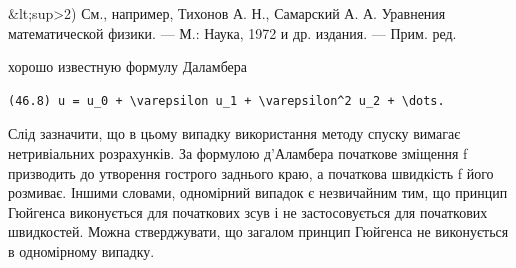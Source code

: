 \documentclass[
  ukrainian,
]{article}
\begin{document}
\&lt;sup\textgreater2) См., например, Тихонов А. Н., Самарский А. А.
Уравнения математической физики. --- М.: Наука, 1972 и др. издания. ---
Прим. ред.

хорошо известную формулу Даламбера

\begin{verbatim}
(46.8) u = u_0 + \varepsilon u_1 + \varepsilon^2 u_2 + \dots.
\end{verbatim}

Слід зазначити, що в цьому випадку використання методу спуску вимагає
нетривіальних розрахунків. За формулою д'Аламбера початкове зміщення f
призводить до утворення гострого заднього краю, а початкова швидкість f
його розмиває. Іншими словами, одномірний випадок є незвичайним тим, що
принцип Гюйгенса виконується для початкових зсув і не застосовується для
початкових швидкостей. Можна стверджувати, що загалом принцип Гюйгенса
не виконується в одномірному випадку.
\end{document}
